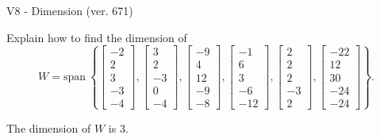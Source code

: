\begin{exercise}
  \begin{exerciseTitle}V8 - Dimension (ver. 671)\end{exerciseTitle}
  \begin{exerciseStatement}
    Explain how to find the dimension of 
\[W=\mathrm{span}\ \left\{\left[\begin{array}{r}
-2 \\
2 \\
3 \\
-3 \\
-4
\end{array}\right] , \left[\begin{array}{r}
3 \\
2 \\
-3 \\
0 \\
-4
\end{array}\right] , \left[\begin{array}{r}
-9 \\
4 \\
12 \\
-9 \\
-8
\end{array}\right] , \left[\begin{array}{r}
-1 \\
6 \\
3 \\
-6 \\
-12
\end{array}\right] , \left[\begin{array}{r}
2 \\
2 \\
2 \\
-3 \\
2
\end{array}\right] , \left[\begin{array}{r}
-22 \\
12 \\
30 \\
-24 \\
-24
\end{array}\right]\right\}.\]



  \end{exerciseStatement}
  \begin{exerciseAnswer}
   The dimension of \(W\) is  \(3\).
  


  \end{exerciseAnswer}
\end{exercise}